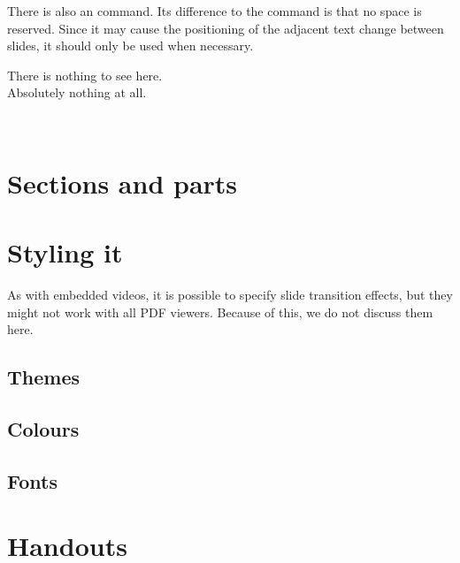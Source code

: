 
There is also an  command.
Its difference to the  command is that no space is reserved.
Since it may cause the positioning of the adjacent text change
between slides, it should only be used when necessary.
%
\begin{ExampleCode}
\begin{frame}

There is nothing to see here.\\
Absolutely nothing at all.

\end{frame}
\end{ExampleCode}
%
\begin{center}
~
\end{center}




%
%
\section{Sections and parts}






%
%
\section{Styling it}\label{sec:beamer styles}




\begin{technote}
As with embedded videos, it is possible to specify slide transition effects,
but they might not work with all PDF viewers.
Because of this, we do not discuss them here.
\end{technote}

\subsection{Themes}

\subsection{Colours}

\subsection{Fonts}


%
%
\section{Handouts}


